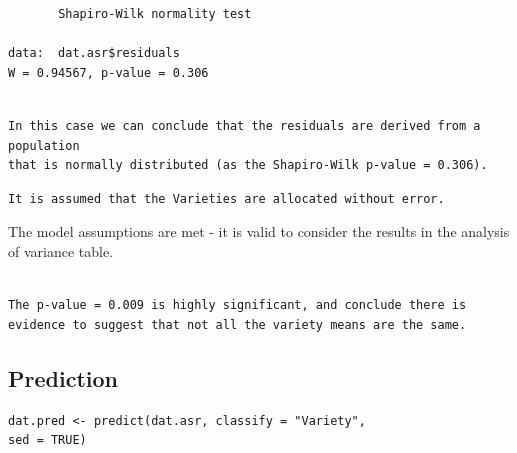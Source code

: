 \documentclass[a4paper, 10pt, fleqn, twosided]{memoir}
\begin{document}
\begin{tcolorbox}[title = Example 3 Shapiro-Wilk normality test output]
\begin{verbatim}
       Shapiro-Wilk normality test

data:  dat.asr$residuals
W = 0.94567, p-value = 0.306
\end{verbatim}
\end{tcolorbox}


\begin{tcolorbox}[title = Example 3 Shapiro-Wilk normality test interpretation]
\begin{verbatim}

In this case we can conclude that the residuals are derived from a population
that is normally distributed (as the Shapiro-Wilk p-value = 0.306).

\end{verbatim}
\end{tcolorbox}



\begin{tcolorbox}[title = Example 3 Assumption 5]
\begin{verbatim}
It is assumed that the Varieties are allocated without error.
\end{verbatim}
\end{tcolorbox}

The model assumptions are met - it is valid to consider the results in the analysis of variance table.

\begin{tcolorbox}[title = Example 3 ANOVA interpretation]
\begin{verbatim}

The p-value = 0.009 is highly significant, and conclude there is
evidence to suggest that not all the variety means are the same.
\end{verbatim}
\end{tcolorbox}
\subsection{Prediction}

\begin{tcolorbox}[title = Example 3 predicted values]
\begin{verbatim}
dat.pred <- predict(dat.asr, classify = "Variety",
sed = TRUE)
\end{verbatim}
\end{tcolorbox}
\end{document}
